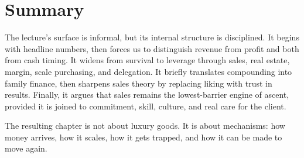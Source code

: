 \section{Summary}

The lecture's surface is informal, but its internal structure is disciplined. It begins with headline numbers, then forces us to distinguish revenue from profit and both from cash timing. It widens from survival to leverage through sales, real estate, margin, scale purchasing, and delegation. It briefly translates compounding into family finance, then sharpens sales theory by replacing liking with trust in results. Finally, it argues that sales remains the lowest-barrier engine of ascent, provided it is joined to commitment, skill, culture, and real care for the client.

The resulting chapter is not about luxury goods. It is about mechanisms: how money arrives, how it scales, how it gets trapped, and how it can be made to move again.